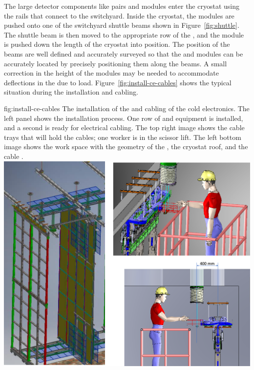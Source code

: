 The large detector components like  pairs and  modules enter the cryostat using the  rails that connect to the  switchyard. 
Inside the cryostat, the modules are pushed onto one of the switchyard shuttle beams shown in  Figure~\ref{fig:shuttle}. 
The  shuttle beam is then moved to the appropriate row of the , and  the module is pushed down the length of the cryostat into position. The position of the  beams are well defined and accurately surveyed so that the  and  modules can be accurately located by precisely positioning them along the  beams. 
A small correction in the height of the modules may be needed to accommodate deflections in the  due to load. Figure~\ref{fig:install-ce-cables} shows the typical situation during the  installation and  cabling. 

\begin{dunefigure}{fig:install-ce-cables}
  {The installation of the   and cabling of the cold electronics.
  The left panel shows the   installation process. 
  One row of   and  equipment is installed, and a second   is ready for electrical cabling. 
  The top right image shows the cable trays that will hold the   cables; one worker is in the scissor lift. 
  The left bottom image shows the work space with the geometry of the , the cryostat roof, and the cable \fdth .
  }
\includegraphics[width=.95\textwidth]{graphics/install-ce-cables.png}

\end{dunefigure}

